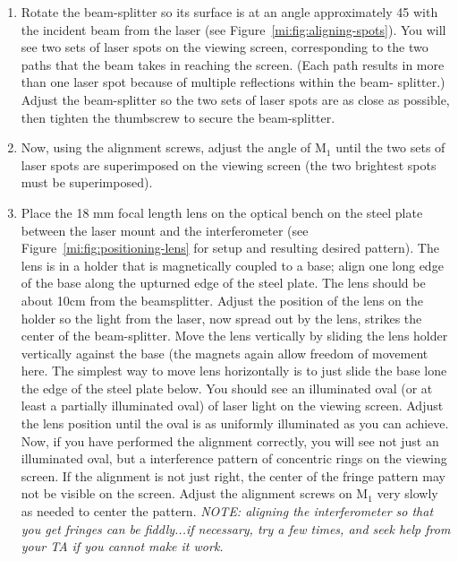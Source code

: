 \begin{enumerate}
	\item Rotate the beam-splitter so its surface is at an angle approximately 45 with the incident beam from the laser (see Figure~\ref{mi:fig:aligning-spots}). You will see two sets of laser spots on the viewing screen, corresponding to the two paths that the beam takes in reaching the screen. (Each path results in more than one laser spot because of multiple reflections within the beam-
	splitter.) Adjust the beam-splitter so the two sets of laser spots are as close as possible, then tighten the thumbscrew
	to secure the beam-splitter.
	
	\item Now, using the alignment screws, adjust the angle of M$_1$ until the two sets of laser spots are superimposed on the
	viewing screen (the two brightest spots must be superimposed).
	
	\item Place the 18 mm focal length lens on the optical bench on the steel plate between the laser mount and the
	interferometer (see Figure~\ref{mi:fig:positioning-lens} for setup and resulting desired pattern). The lens is in a holder that is magnetically coupled to a base; align one long edge of the base along the
	upturned edge of the steel plate. The lens should be about 10cm from the beamsplitter. Adjust the position of the lens
	on the holder so the light from the laser, now spread out by the lens, strikes the center of the beam-splitter. Move the
	lens vertically by sliding the lens holder vertically against the base (the magnets again allow freedom of movement
	here. The simplest way to move lens horizontally is to just slide the base lone the edge of the steel plate below. You
	should see an illuminated oval (or at least a partially illuminated oval) of laser light on the viewing screen. Adjust the
	lens position until the oval is as uniformly illuminated as you can achieve. Now, if you have performed the alignment
	correctly, you will see not just an illuminated oval, but a interference pattern of concentric rings on the viewing screen.
	If the alignment is not just right, the center of the fringe pattern may not be visible on the screen. Adjust the alignment
	screws on M$_1$ very slowly as needed to center the pattern. \textit{NOTE: aligning the interferometer so that you get fringes
	can be fiddly...if necessary, try a few times, and seek help from your TA if you cannot make it work.}


\end{enumerate}
